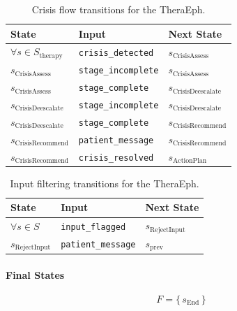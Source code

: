 \documentclass[twoside]{report}
\begin{document}
\FloatBarrier

\begin{table}[h!]
\centering
\small
\begin{tabular}{lll}
\toprule
\textbf{State} & \textbf{Input} & \textbf{Next State} \\
\midrule
$\forall s \in S_{\text{therapy}}$  & \texttt{crisis\_detected}   & $s_{\text{CrisisAssess}}$ \\
$s_{\text{CrisisAssess}}$           & \texttt{stage\_incomplete}  & $s_{\text{CrisisAssess}}$ \\
$s_{\text{CrisisAssess}}$           & \texttt{stage\_complete}    & $s_{\text{CrisisDeescalate}}$ \\
$s_{\text{CrisisDeescalate}}$       & \texttt{stage\_incomplete}  & $s_{\text{CrisisDeescalate}}$ \\
$s_{\text{CrisisDeescalate}}$       & \texttt{stage\_complete}    & $s_{\text{CrisisRecommend}}$ \\
$s_{\text{CrisisRecommend}}$        & \texttt{patient\_message}   & $s_{\text{CrisisRecommend}}$ \\
$s_{\text{CrisisRecommend}}$        & \texttt{crisis\_resolved}   & $s_{\text{ActionPlan}}$ \\
\bottomrule
\end{tabular}
\caption{Crisis flow transitions for the TheraEph.}
\label{tab:fsm-crisis}
\end{table}

\FloatBarrier

\begin{table}[h!]
\centering
\small
\begin{tabular}{lll}
\toprule
\textbf{State} & \textbf{Input} & \textbf{Next State} \\
\midrule
$\forall s \in S$                   & \texttt{input\_flagged}     & $s_{\text{RejectInput}}$ \\
$s_{\text{RejectInput}}$            & \texttt{patient\_message}   & $s_{\text{prev}}$ \\
\bottomrule
\end{tabular}
\caption{Input filtering transitions for the TheraEph.}
\label{tab:fsm-filtering}
\end{table}

\FloatBarrier


\paragraph{Final States}
\[
F = \{\, s_{\text{End}} \,\}
\]
\end{document}
